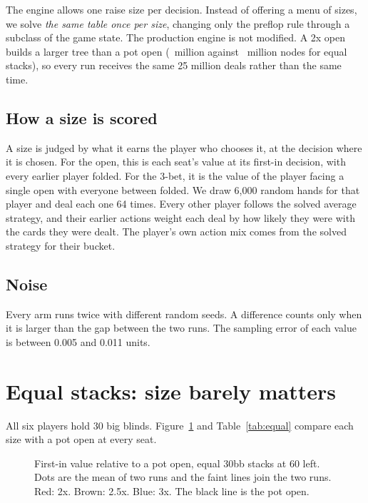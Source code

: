 \documentclass[10pt]{article}
\begin{document}
The engine allows one raise size per decision. Instead of offering a menu of sizes, we solve
\emph{the same table once per size}, changing only the preflop rule through a subclass of the game
state. The production engine is not modified. A 2x open builds a larger tree than a pot open
(\NodesTwoX\ million against \NodesTwo\ million nodes for equal stacks), so every run receives the
same 25 million deals rather than the same time.

\subsection{How a size is scored}
A size is judged by what it earns the player who chooses it, at the decision where it is chosen. For
the open, this is each seat's value at its first-in decision, with every earlier player folded. For
the 3-bet, it is the value of the player facing a single open with everyone between folded. We draw
6{,}000 random hands for that player and deal each one 64 times. Every other player follows the
solved average strategy, and their earlier actions weight each deal by how likely they were with the
cards they were dealt. The player's own action mix comes from the solved strategy for their bucket.

\subsection{Noise}
Every arm runs twice with different random seeds. A difference counts only when it is larger than the
gap between the two runs. The sampling error of each value is between 0.005 and 0.011 units.

\section{Equal stacks: size barely matters}
All six players hold 30 big blinds. Figure~\ref{fig:equal} and Table~\ref{tab:equal} compare each
size with a pot open at every seat.

\begin{figure}[H]
\centering

\caption{First-in value relative to a pot open, equal 30bb stacks at 60 left. Dots are the mean of two
runs and the faint lines join the two runs. Red: 2x. Brown: 2.5x. Blue: 3x. The black line is the pot
open.}
\label{fig:equal}
\end{figure}

\begin{table}[H]
\centering\small
\caption{Equal stacks: first-in value relative to a pot open, the largest two-run gap at that seat,
and the raise / limp frequency with a 2x and a pot open.}
\label{tab:equal}

\end{table}
\end{document}
